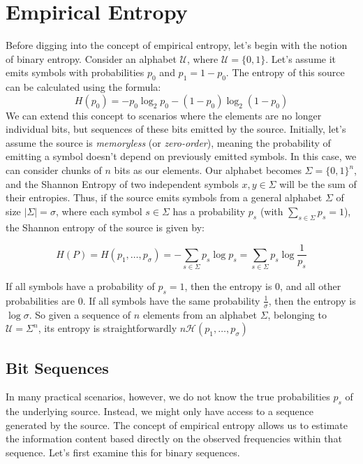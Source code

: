 \section{Empirical Entropy}
Before digging into the concept of empirical entropy, let's begin with the notion of binary entropy. Consider an alphabet $\mathcal{U}$, where $\mathcal{U} = \{0, 1\}$. Let's assume it emits symbols with probabilities $p_0$ and $p_1 = 1 - p_0$. The entropy of this source can be calculated using the formula:
\[
    H(p_0) = -p_0 \log_2 p_0 - (1 - p_0) \log_2 (1 - p_0)
\]
We can extend this concept to scenarios where the elements are no longer individual bits, but sequences of these bits emitted by the source. Initially, let's assume the source is \emph{memoryless} (or \emph{zero-order}), meaning the probability of emitting a symbol doesn't depend on previously emitted symbols. In this case, we can consider chunks of $n$ bits as our elements. Our alphabet becomes $\Sigma = \{0, 1\}^n$, and the Shannon Entropy of two independent symbols $x, y \in \Sigma$ will be the sum of their entropies. Thus, if the source emits symbols from a general alphabet $\Sigma$ of size $|\Sigma| = \sigma$, where each symbol $s \in \Sigma$ has a probability $p_s$ (with $\sum_{s \in \Sigma} p_s = 1$), the Shannon entropy of the source is given by:

\[
    H(P) = H(p_1, \ldots, p_{\sigma}) = - \sum_{s \in \Sigma} p_s \log p_s = \sum_{s \in \Sigma} p_s \log \frac{1}{p_s}
\]

\begin{remark}
    If all symbols have a probability of $p_s =1$, then the entropy is $0$, and all other probabilities are $0$. If all symbols have the same probability $\frac{1}{\sigma}$, then the entropy is $\log \sigma$. So given a sequence of $n$ elements from an alphabet $\Sigma$, belonging to $\mathcal{U} = \Sigma^n$, its entropy is straightforwardly $n \mathcal{H}(p_1, \ldots, p_{\sigma})$
\end{remark}


\subsection{Bit Sequences}
In many practical scenarios, however, we do not know the true probabilities $p_s$ of the underlying source. Instead, we might only have access to a sequence generated by the source. The concept of empirical entropy allows us to estimate the information content based directly on the observed frequencies within that sequence. Let's first examine this for binary sequences.


